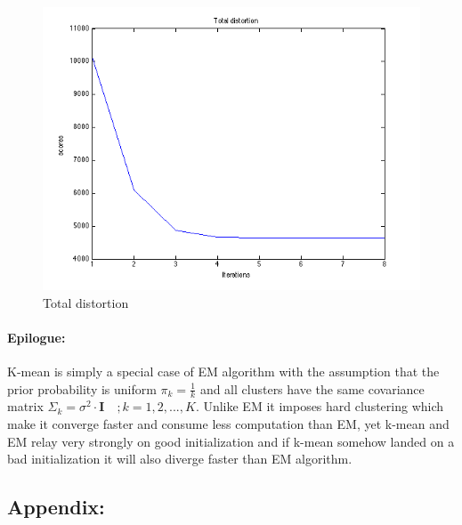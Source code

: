 \documentclass[a4paper]{article}
\begin{document}
	\begin{figure}[H]
	  \centering
	    \includegraphics[scale=.57]{images/distortion.png}
	  \caption{Total distortion}
	\end{figure}
	
\paragraph{Epilogue: } K-mean is simply a special case of EM algorithm with the assumption that the prior probability is uniform $\pi_k = \frac{1}{k}$ and all clusters have the same covariance matrix $\Sigma_k = \sigma^2 \cdot \mathbf{I} \quad; k=1,2,...,K$. Unlike EM it imposes hard clustering which make it converge faster and consume less computation than EM, yet k-mean and EM relay very strongly on good initialization and if k-mean somehow landed on a bad initialization it will also diverge faster than EM algorithm.

\newpage
\subsection*{Appendix:}
	
	
		
	
	
	
	
		
\end{document}
